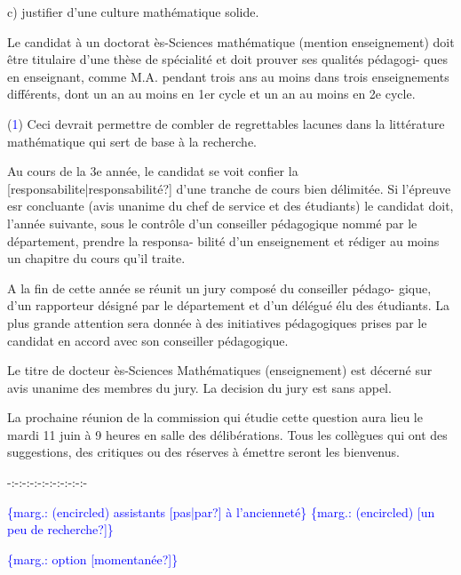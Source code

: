 \documentclass[11pt]{article}
\newcommand{\scanpage}[1]{\par\bigskip\noindent{\small\sffamily[scan #1]}\par}
\newcommand{\mspage}[1]{{\small\sffamily[p.\,#1]}}
\newcommand{\hand}[1]{\textcolor{blue}{#1}}
\newcommand{\margin}[1]{\textcolor{blue}{\{\textsf{marg.:} #1\}}}
\newcommand{\unsure}[1]{[#1?]}
\begin{document}
c) justifier d'une culture mathématique solide.

Le candidat à un doctorat ès-Sciences mathématique (mention enseignement)
doit être titulaire d'une thèse de spécialité et doit prouver ses qualités pédagogi-%
ques en enseignant, comme M.A. pendant trois ans au moins dans trois enseignements
différents, dont un an au moins en 1er cycle et un an au moins en 2e cycle.

(\hand{1}) Ceci devrait permettre de combler de regrettables lacunes dans la littérature
mathématique qui sert de base à la recherche.

\mspage{272}

\clearpage
\scanpage{119/273}
Au cours de la 3e année, le candidat se voit confier la \unsure{responsabilite|responsabilité}
d'une tranche de cours bien délimitée. Si l'épreuve esr concluante (avis unanime
du chef de service et des étudiants) le candidat doit, l'année suivante, sous le
contrôle d'un conseiller pédagogique nommé par le département, prendre la responsa-%
bilité d'un enseignement et rédiger au moins un chapitre du cours qu'il traite.

A la fin de cette année se réunit un jury composé du conseiller pédago-%
gique, d'un rapporteur désigné par le département et d'un délégué élu des étudiants.
La plus grande attention sera donnée à des initiatives pédagogiques prises par le
candidat en accord avec son conseiller pédagogique.

Le titre de docteur ès-Sciences Mathématiques (enseignement) est décerné
sur avis unanime des membres du jury. La decision du jury est sans appel.

La prochaine réunion de la commission qui étudie cette question aura
lieu le mardi 11 juin à 9 heures en salle des délibérations. Tous les collègues
qui ont des suggestions, des critiques ou des réserves à émettre seront les
bienvenus.

-:-:-:-:-:-:-:-:-:-:-

\margin{(encircled) assistants \unsure{pas|par} à l'ancienneté} \margin{(encircled) \unsure{un peu de recherche}}

\margin{option \unsure{momentanée}}
\end{document}
